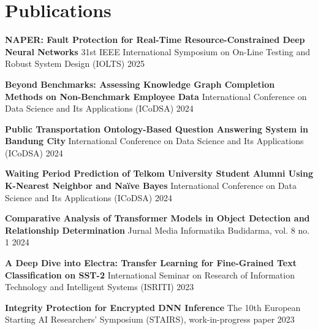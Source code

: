 \section{Publications}
    \resumeSubHeadingListStart

    \resumePublicationHeading
    {\textbf{NAPER: Fault Protection for Real-Time Resource-Constrained Deep Neural Networks}}
    {31st IEEE International Symposium on On-Line Testing and Robust System Design (IOLTS)}
    {2025}

    \resumePublicationHeading
    {\textbf{Beyond Benchmarks: Assessing Knowledge Graph Completion Methods on Non-Benchmark Employee Data}}
    {International Conference on Data Science and Its Applications (ICoDSA)}
    {2024}

    \resumePublicationHeading
    {\textbf{Public Transportation Ontology-Based Question Answering System in Bandung City}}
    {International Conference on Data Science and Its Applications (ICoDSA)}
    {2024}

    \resumePublicationHeading
    {\textbf{Waiting Period Prediction of Telkom University Student Alumni Using K-Nearest Neighbor and Naïve Bayes}}
    {International Conference on Data Science and Its Applications (ICoDSA)}
    {2024}

    \resumePublicationHeading
    {\textbf{Comparative Analysis of Transformer Models in Object Detection and Relationship Determination}}
    {Jurnal Media Informatika Budidarma, vol. 8 no. 1}
    {2024}

    \resumePublicationHeading
    {\textbf{A Deep Dive into Electra: Transfer Learning for Fine-Grained Text Classification on SST-2}}
    {International Seminar on Research of Information Technology and Intelligent Systems (ISRITI)}
    {2023}

    \resumePublicationHeading
    {\textbf{Integrity Protection for Encrypted DNN Inference}}
    {The 10th European Starting AI Researchers' Symposium (STAIRS), work-in-progress paper}
    {2023}

    \resumeSubHeadingListEnd